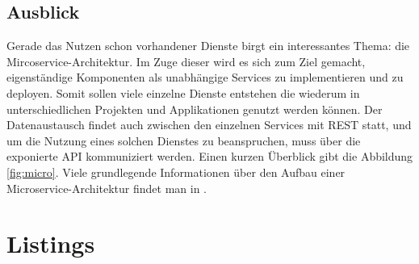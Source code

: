 \documentclass[fleqn,10.5pt,ngerman]{SelfArx}
\begin{document}
\subsection{Ausblick}
Gerade das Nutzen schon vorhandener Dienste birgt ein interessantes Thema: die Mircoservice-Architektur. Im Zuge dieser wird es sich zum Ziel gemacht, eigenständige Komponenten als unabhängige Services zu implementieren und zu deployen. Somit sollen viele einzelne Dienste entstehen die wiederum in unterschiedlichen Projekten und Applikationen genutzt werden können. Der Datenaustausch findet auch zwischen den einzelnen Services mit REST statt, und um die Nutzung eines solchen Dienstes zu beanspruchen, muss über die exponierte API kommuniziert werden. Einen kurzen Überblick gibt die Abbildung \ref{fig:micro}.
Viele grundlegende Informationen über den Aufbau einer Microservice-Architektur findet man in \cite{microservice}. 

\clearpage
\appendix
\cleardoublepage
\onecolumn
\newpage





\clearpage
\appendix
\cleardoublepage
\newpage
\onecolumn

\section{Listings}

\newpage

\newpage

\newpage
\end{document}
